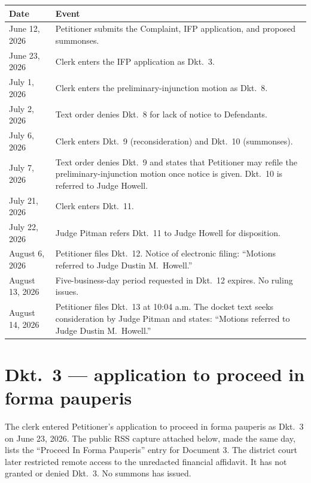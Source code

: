 \documentclass[14pt]{extarticle}
\begin{document}
\begin{singlespace}
\begin{tabularx}{\textwidth}{@{}>{\raggedright\arraybackslash}p{1.45in}X@{}}
\hline
\textbf{Date} & \textbf{Event} \\
\hline
June 12, 2026 & Petitioner submits the Complaint, IFP application, and proposed summonses. \\
June 23, 2026 & Clerk enters the IFP application as Dkt.\ 3. \\
July 1, 2026 & Clerk enters the preliminary-injunction motion as Dkt.\ 8. \\
July 2, 2026 & Text order denies Dkt.\ 8 for lack of notice to Defendants. \\
July 6, 2026 & Clerk enters Dkt.\ 9 (reconsideration) and Dkt.\ 10 (summonses). \\
July 7, 2026 & Text order denies Dkt.\ 9 and states that Petitioner may refile the preliminary-injunction motion once notice is given. Dkt.\ 10 is referred to Judge Howell. \\
July 21, 2026 & Clerk enters Dkt.\ 11. \\
July 22, 2026 & Judge Pitman refers Dkt.\ 11 to Judge Howell for disposition. \\
August 6, 2026 & Petitioner files Dkt.\ 12. Notice of electronic filing: ``Motions referred to Judge Dustin M.\ Howell.'' \\
August 13, 2026 & Five-business-day period requested in Dkt.\ 12 expires. No ruling issues. \\
August 14, 2026 & Petitioner files Dkt.\ 13 at 10:04 a.m. The docket text seeks consideration by Judge Pitman and states: ``Motions referred to Judge Dustin M.\ Howell.'' \\
\hline
\end{tabularx}
\end{singlespace}

\vspace{0.8em}
\section*{Dkt.\ 3 --- application to proceed in forma pauperis}

The clerk entered Petitioner's application to proceed in forma pauperis as Dkt.\ 3 on June 23, 2026. The public RSS capture attached below, made the same day, lists the ``Proceed In Forma Pauperis'' entry for Document 3. The district court later restricted remote access to the unredacted financial affidavit. It has not granted or denied Dkt.\ 3. No summons has issued.
\end{document}

